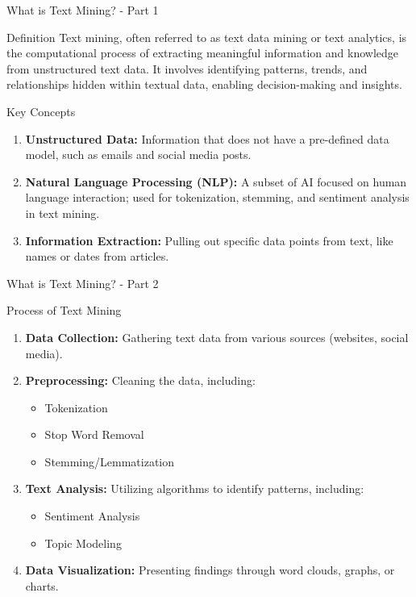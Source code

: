 \documentclass[aspectratio=169]{beamer}
\begin{document}
\begin{frame}[fragile]{What is Text Mining? - Part 1}
    \begin{block}{Definition}
        Text mining, often referred to as text data mining or text analytics, is the computational process of extracting meaningful information and knowledge from unstructured text data. It involves identifying patterns, trends, and relationships hidden within textual data, enabling decision-making and insights.
    \end{block}
    
    \begin{block}{Key Concepts}
        \begin{enumerate}
            \item \textbf{Unstructured Data:} Information that does not have a pre-defined data model, such as emails and social media posts.
            \item \textbf{Natural Language Processing (NLP):} A subset of AI focused on human language interaction; used for tokenization, stemming, and sentiment analysis in text mining.
            \item \textbf{Information Extraction:} Pulling out specific data points from text, like names or dates from articles.
        \end{enumerate}
    \end{block}
\end{frame}

\begin{frame}[fragile]{What is Text Mining? - Part 2}
    \begin{block}{Process of Text Mining}
        \begin{enumerate}
            \item \textbf{Data Collection:} Gathering text data from various sources (websites, social media).
            \item \textbf{Preprocessing:} Cleaning the data, including:
            \begin{itemize}
                \item Tokenization
                \item Stop Word Removal
                \item Stemming/Lemmatization
            \end{itemize}
            \item \textbf{Text Analysis:} Utilizing algorithms to identify patterns, including:
            \begin{itemize}
                \item Sentiment Analysis
                \item Topic Modeling
            \end{itemize}
            \item \textbf{Data Visualization:} Presenting findings through word clouds, graphs, or charts.
        \end{enumerate}
    \end{block}
\end{frame}
\end{document}
